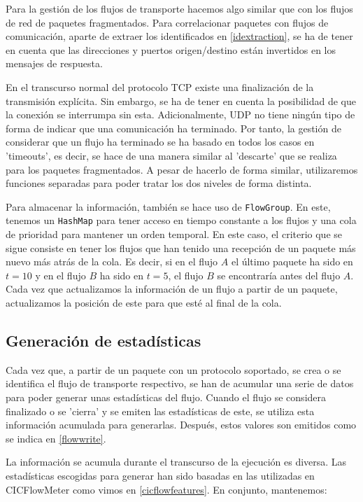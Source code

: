 Para la gestión de los flujos de transporte hacemos algo similar que con los flujos de red de paquetes fragmentados. Para correlacionar paquetes con flujos de comunicación, aparte de extraer los identificados en \ref{idextraction}, se ha de tener en cuenta que las direcciones y puertos origen/destino están invertidos en los mensajes de respuesta.

En el transcurso normal del protocolo TCP existe una finalización de la transmisión explícita. Sin embargo, se ha de tener en cuenta la posibilidad de que la conexión se interrumpa sin esta. Adicionalmente, UDP no tiene ningún tipo de forma de indicar que una comunicación ha terminado. Por tanto, la gestión de considerar que un flujo ha terminado se ha basado en todos los casos en 'timeouts', es decir, se hace de una manera similar al 'descarte' que se realiza para los paquetes fragmentados. A pesar de hacerlo de forma similar, utilizaremos funciones separadas para poder tratar los dos niveles de forma distinta.

Para almacenar la información, también se hace uso de \texttt{FlowGroup}. En este, tenemos un \texttt{HashMap} para tener acceso en tiempo constante a los flujos y una cola de prioridad para mantener un orden temporal. En este caso, el criterio que se sigue consiste en tener los flujos que han tenido una recepción de un paquete más nuevo más atrás de la cola. Es decir, si en el flujo $A$ el último paquete ha sido en $t=10$ y en el flujo $B$ ha sido en $t=5$, el flujo $B$ se encontraría antes del flujo $A$. Cada vez que actualizamos la información de un flujo a partir de un paquete, actualizamos la posición de este para que esté al final de la cola.

\subsection{Generación de estadísticas} \label{statsgen}

Cada vez que, a partir de un paquete con un protocolo soportado, se crea o se identifica el flujo de transporte respectivo, se han de acumular una serie de datos para poder generar unas estadísticas del flujo. Cuando el flujo se considera finalizado o se 'cierra' y se emiten las estadísticas de este, se utiliza esta información acumulada para generarlas. Después, estos valores son emitidos como se indica en \ref{flowwrite}.

La información se acumula durante el transcurso de la ejecución es diversa. Las estadísticas escogidas para generar han sido basadas en las utilizadas en CICFlowMeter como vimos en \ref{cicflowfeatures}. En conjunto, mantenemos:

